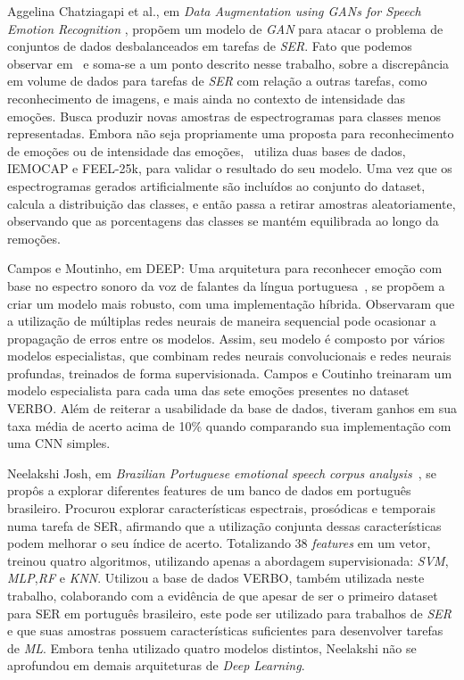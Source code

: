Aggelina Chatziagapi et al., em \textit{Data Augmentation using GANs for Speech Emotion Recognition }\cite{32.89}, propõem um modelo de \textit{GAN} para atacar o problema de conjuntos de dados desbalanceados em tarefas de \textit{SER}. Fato que podemos observar em~\cite{32.32} e soma-se a um ponto descrito nesse trabalho, sobre a discrepância em volume de dados para tarefas de \textit{SER} com relação a outras tarefas, como reconhecimento de imagens, e mais ainda no contexto de intensidade das emoções. Busca produzir novas amostras de espectrogramas para classes menos representadas. Embora não seja propriamente uma proposta para reconhecimento de emoções ou de intensidade das emoções,~\cite{32.89} utiliza duas bases de dados, IEMOCAP e FEEL-25k, para validar o resultado do seu modelo. Uma vez que os espectrogramas gerados artificialmente são incluídos ao conjunto do dataset, calcula a distribuição das classes, e então passa a retirar amostras aleatoriamente, observando que as porcentagens das classes se mantém equilibrada ao longo da remoções.

Campos e Moutinho, em DEEP: Uma arquitetura para reconhecer emoção com base no espectro sonoro da voz de falantes da língua portuguesa~\cite{12}, se propõem a criar um modelo mais robusto, com uma implementação híbrida. Observaram que a utilização de múltiplas redes neurais de maneira sequencial pode ocasionar a propagação de erros entre os modelos. Assim, seu modelo é composto por vários modelos especialistas, que combinam redes neurais convolucionais e redes neurais profundas, treinados de forma supervisionada. Campos e Coutinho treinaram um modelo especialista para cada uma das sete emoções presentes no dataset VERBO. Além de reiterar a usabilidade da base de dados, tiveram ganhos em sua taxa média de acerto acima de 10\% quando comparando sua implementação com uma CNN simples.

Neelakshi Josh, em \textit{Brazilian Portuguese emotional speech corpus analysis}~\cite{20}, se propôs a explorar diferentes features de um banco de dados em português brasileiro. Procurou explorar características espectrais, prosódicas e temporais numa tarefa de SER, afirmando que a utilização conjunta dessas características podem melhorar o seu índice de acerto. Totalizando 38 \textit{features} em um vetor, treinou quatro algoritmos, utilizando apenas a abordagem supervisionada: \textit{SVM}, \textit{MLP},\textit{RF} e \textit{KNN}. Utilizou a base de dados VERBO, também utilizada neste trabalho, colaborando com a evidência de que apesar de ser o primeiro dataset para SER em português brasileiro, este pode ser utilizado para trabalhos de \textit{SER} e que suas amostras possuem características suficientes para desenvolver tarefas de \textit{ML}. Embora tenha utilizado quatro modelos distintos, Neelakshi não se aprofundou em demais arquiteturas de \textit{Deep Learning}.

